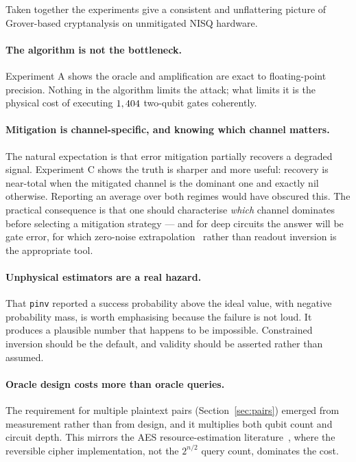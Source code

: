 \documentclass[11pt,a4paper]{article}
\begin{document}
Taken together the experiments give a consistent and unflattering picture of
Grover-based cryptanalysis on unmitigated NISQ hardware.

\paragraph{The algorithm is not the bottleneck.} Experiment A shows the oracle
and amplification are exact to floating-point precision. Nothing in the
algorithm limits the attack; what limits it is the physical cost of executing
$1,404$ two-qubit gates coherently.

\paragraph{Mitigation is channel-specific, and knowing which channel matters.}
The natural expectation is that error mitigation partially recovers a degraded
signal. Experiment C shows the truth is sharper and more useful: recovery is
near-total when the mitigated channel is the dominant one and exactly nil
otherwise. Reporting an average over both regimes would have obscured this.
The practical consequence is that one should characterise \emph{which} channel
dominates before selecting a mitigation strategy --- and for deep circuits the
answer will be gate error, for which zero-noise
extrapolation~\citep{temme2017,li2017} rather than readout inversion is the
appropriate tool.

\paragraph{Unphysical estimators are a real hazard.} That \texttt{pinv} reported
a success probability above the ideal value, with negative probability mass, is
worth emphasising because the failure is not loud. It produces a plausible
number that happens to be impossible. Constrained inversion should be the
default, and validity should be asserted rather than assumed.

\paragraph{Oracle design costs more than oracle queries.} The requirement for
multiple plaintext pairs (Section~\ref{sec:pairs}) emerged from measurement
rather than from design, and it multiplies both qubit count and circuit depth.
This mirrors the AES resource-estimation
literature~\citep{grassl2016,jaques2020}, where the reversible cipher
implementation, not the $2^{n/2}$ query count, dominates the cost.
\end{document}
